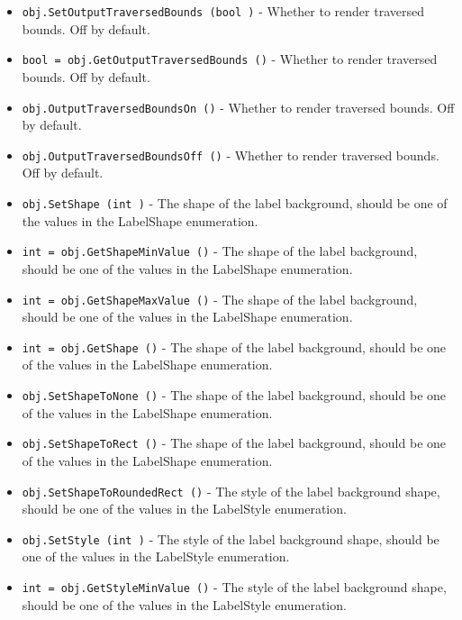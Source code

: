 \begin{itemize}
\item  \verb|obj.SetOutputTraversedBounds (bool )| -  Whether to render traversed bounds. Off by default.

\item  \verb|bool = obj.GetOutputTraversedBounds ()| -  Whether to render traversed bounds. Off by default.

\item  \verb|obj.OutputTraversedBoundsOn ()| -  Whether to render traversed bounds. Off by default.

\item  \verb|obj.OutputTraversedBoundsOff ()| -  Whether to render traversed bounds. Off by default.

\item  \verb|obj.SetShape (int )| -  The shape of the label background, should be one of the
 values in the LabelShape enumeration.

\item  \verb|int = obj.GetShapeMinValue ()| -  The shape of the label background, should be one of the
 values in the LabelShape enumeration.

\item  \verb|int = obj.GetShapeMaxValue ()| -  The shape of the label background, should be one of the
 values in the LabelShape enumeration.

\item  \verb|int = obj.GetShape ()| -  The shape of the label background, should be one of the
 values in the LabelShape enumeration.

\item  \verb|obj.SetShapeToNone ()| -  The shape of the label background, should be one of the
 values in the LabelShape enumeration.

\item  \verb|obj.SetShapeToRect ()| -  The shape of the label background, should be one of the
 values in the LabelShape enumeration.

\item  \verb|obj.SetShapeToRoundedRect ()| -  The style of the label background shape, should be one of the
 values in the LabelStyle enumeration.

\item  \verb|obj.SetStyle (int )| -  The style of the label background shape, should be one of the
 values in the LabelStyle enumeration.

\item  \verb|int = obj.GetStyleMinValue ()| -  The style of the label background shape, should be one of the
 values in the LabelStyle enumeration.


\end{itemize}
